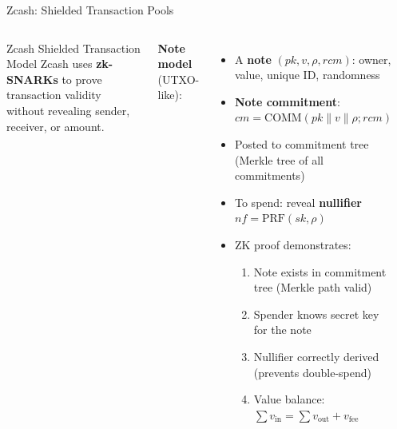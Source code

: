 \documentclass[8pt,aspectratio=169]{beamer}
\begin{document}
\begin{frame}{Zcash: Shielded Transaction Pools}
\begin{columns}[T]
\begin{block}{\footnotesize Zcash Shielded Transaction Model}
\footnotesize
Zcash uses \textbf{zk-SNARKs} to prove transaction validity without revealing sender, receiver, or amount.
\end{block}
\vspace{0.1cm}
\footnotesize
\textbf{Note model} (UTXO-like):
\begin{itemize}
\item A \textbf{note} $(pk, v, \rho, rcm)$: owner, value, unique ID, randomness
\item \textbf{Note commitment}: $cm = \text{COMM}(pk \| v \| \rho; rcm)$
\item Posted to commitment tree (Merkle tree of all commitments)
\item To spend: reveal \textbf{nullifier} $nf = \text{PRF}(sk, \rho)$
\item ZK proof demonstrates:
  \begin{enumerate}
  \item Note exists in commitment tree (Merkle path valid)
  \item Spender knows secret key for the note
  \item Nullifier correctly derived (prevents double-spend)
  \item Value balance: $\sum v_{\text{in}} = \sum v_{\text{out}} + v_{\text{fee}}$
  \end{enumerate}
\end{itemize}
\begin{center}
\end{center}
\end{columns}
\end{frame}
\end{document}

